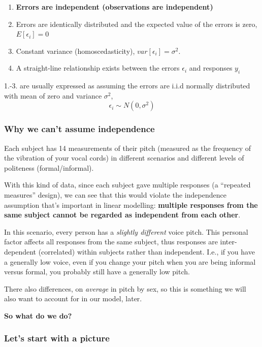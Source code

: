 \documentclass[
  openany]{book}
\providecommand{\tightlist}{%
  \setlength{\itemsep}{0pt}\setlength{\parskip}{0pt}}
\begin{document}
\begin{enumerate}
\def\labelenumi{\arabic{enumi}.}
\tightlist
\item
  \textbf{Errors are independent (observations are independent)}
\item
  Errors are identically distributed and the expected value of the errors is zero, \(E[\epsilon_i]=0\)
\item
  Constant variance (homoscedasticity), \(var[\epsilon_i] = \sigma^2\).
\item
  A straight-line relationship exists between the errors \(\epsilon_i\) and responses \(y_i\)
\end{enumerate}

1.-3. are usually expressed as assuming the errors are i.i.d normally distributed with mean of zero and variance \(\sigma^2\),
\[\epsilon_i \sim N(0, \sigma^2)\]

\hypertarget{why-we-cant-assume-independence}{%
\subsubsection{Why we can't assume independence}\label{why-we-cant-assume-independence}}

Each subject has 14 measurements of their pitch (measured as the frequency of the vibration of your vocal cords) in different scenarios and different levels of politeness (formal/informal).

With this kind of data, since each subject gave multiple responses (a ``repeated measures'' design), we can see that this would violate the independence assumption that's important in linear modelling: \textbf{multiple responses from the same subject cannot be regarded as independent from each other}.

In this scenario, every person has a \emph{slightly different} voice pitch. This personal factor affects all responses from the same subject, thus responses are inter-dependent (correlated) within subjects rather than independent. I.e., if you have a generally low voice, even if you change your pitch when you are being informal versus formal, you probably still have a generally low pitch.

There also differences, on \emph{average} in pitch by sex, so this is something we will also want to account for in our model, later.

\textbf{So what do we do?}

\hypertarget{lets-start-with-a-picture}{%
\subsubsection{Let's start with a picture}\label{lets-start-with-a-picture}}
\end{document}
